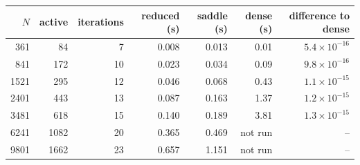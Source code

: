 \begin{tabular}{rrrrrrr}
\toprule
$N$ & active & iterations & reduced (s) & saddle (s) & dense (s) & difference to dense \\
\midrule
361 & 84 & 7 & 0.008 & 0.013 & 0.01 & $5.4\times10^{-16}$ \\
841 & 172 & 10 & 0.023 & 0.034 & 0.09 & $9.8\times10^{-16}$ \\
1521 & 295 & 12 & 0.046 & 0.068 & 0.43 & $1.1\times10^{-15}$ \\
2401 & 443 & 13 & 0.087 & 0.163 & 1.37 & $1.2\times10^{-15}$ \\
3481 & 618 & 15 & 0.140 & 0.189 & 3.81 & $1.3\times10^{-15}$ \\
6241 & 1082 & 20 & 0.365 & 0.469 & not run & -- \\
9801 & 1662 & 23 & 0.657 & 1.151 & not run & -- \\
\bottomrule
\end{tabular}
